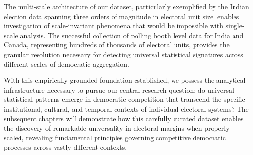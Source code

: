 The multi-scale architecture of our dataset, particularly exemplified by the Indian election data spanning three orders of magnitude in electoral unit size, enables investigation of scale-invariant phenomena that would be impossible with single-scale analysis. The successful collection of polling booth level data for India and Canada, representing hundreds of thousands of electoral units, provides the granular resolution necessary for detecting universal statistical signatures across different scales of democratic aggregation.

With this empirically grounded foundation established, we possess the analytical infrastructure necessary to pursue our central research question: do universal statistical patterns emerge in democratic competition that transcend the specific institutional, cultural, and temporal contexts of individual electoral systems? The subsequent chapters will demonstrate how this carefully curated dataset enables the discovery of remarkable universality in electoral margins when properly scaled, revealing fundamental principles governing competitive democratic processes across vastly different contexts.
